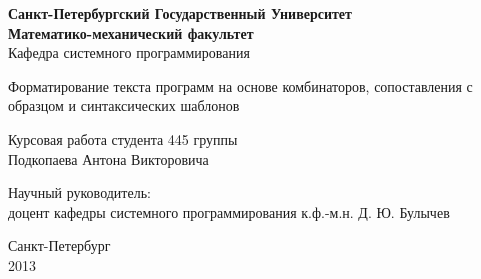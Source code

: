 \begin{titlepage}
\newpage

\begin{center}
	\textbf{
		Санкт-Петербургский Государственный Университет \\
		Математико-механический факультет \\
	}
	Кафедра системного программирования
\end{center}

\vspace{15em}

\begin{center}
\Large Форматирование текста программ на основе комбинаторов, сопоставления с образцом и синтаксических шаблонов \\ 
\end{center}

\vspace{2em}

\begin{center}
Курсовая работа студента 445 группы \\
Подкопаева Антона Викторовича

\end{center}

\vspace{10em}

Научный руководитель:\\
доцент кафедры системного программирования \dotfill
к.ф.-м.н. Д. Ю. Булычев



\vspace{\fill}

\begin{center}
Санкт-Петербург \\2013
\end{center}

\end{titlepage}